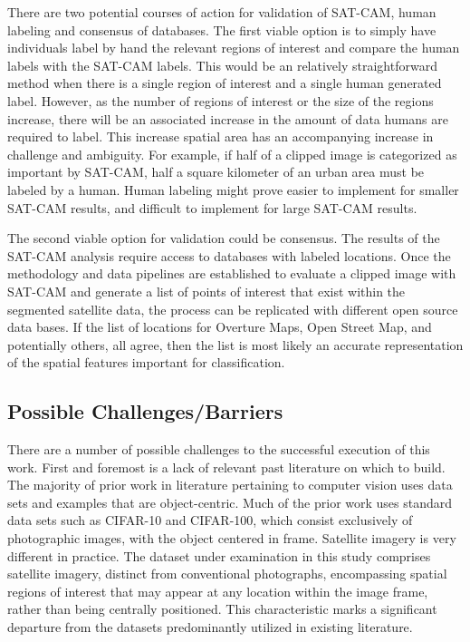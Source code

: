 There are two potential courses of action for validation of SAT-CAM, human labeling and consensus of databases.  The first viable option is to simply have individuals label by hand the relevant regions of interest and compare the human labels with the SAT-CAM labels.  This would be an relatively straightforward method when there is a single region of interest and a single human generated label.  However, as the number of regions of interest or the size of the regions increase, there will be an associated increase in the amount of data humans are required to label.  This increase spatial area has an accompanying increase in challenge and ambiguity.  For example, if half of a clipped image is categorized as important by SAT-CAM, half a square kilometer of an urban area must be labeled by a human.  Human labeling might prove easier to implement for smaller SAT-CAM results, and difficult to implement for large SAT-CAM results.

The second viable option for validation could be consensus.  The results of the SAT-CAM analysis require access to databases with labeled locations.  Once the methodology and data pipelines are established to evaluate a clipped image with SAT-CAM and generate a list of points of interest that exist within the segmented satellite data, the process can be replicated with different open source data bases.  If the list of locations for Overture Maps, Open Street Map, and potentially others, all agree, then the list is most likely an accurate representation of the spatial features important for classification.  



\subsection{Possible Challenges/Barriers}
There are a number of possible challenges to the successful execution of this work.  First and foremost is a lack of relevant past literature on which to build.  The majority of prior work in literature pertaining to computer vision uses data sets and examples that are object-centric.  Much of the prior work uses standard data sets such as CIFAR-10 and CIFAR-100, which consist exclusively of photographic images, with the object centered in frame.  Satellite imagery is very different in practice.  The dataset under examination in this study comprises satellite imagery, distinct from conventional photographs, encompassing spatial regions of interest that may appear at any location within the image frame, rather than being centrally positioned. This characteristic marks a significant departure from the datasets predominantly utilized in existing literature. 

